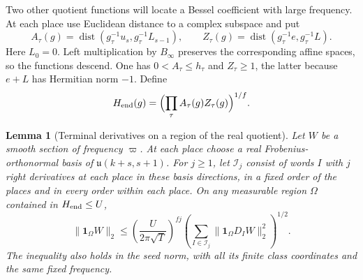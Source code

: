 \documentclass[a4paper,11pt]{article}
\newtheorem{lemma}[proposition]{Lemma}
\theoremstyle{definition}
\theoremstyle{remark}
\numberwithin{equation}{section}
\begin{document}
Two other quotient functions will locate a Bessel coefficient
with large frequency. At each place use Euclidean distance
to a complex subspace and put
\[
 A_\tau(g)=\operatorname{dist}(g_\tau^{-1}u_s,g_\tau^{-1}L_{s-1}),
 \qquad Z_\tau(g)=\operatorname{dist}(g_\tau^{-1}e,g_\tau^{-1}L).
\]
Here \(L_0=0\). Left multiplication by \(B_\infty\) preserves
the corresponding affine spaces, so the functions descend.
One has \(0<A_\tau\le h_\tau\) and \(Z_\tau\ge1\), the latter
because \(e+L\) has Hermitian norm \(-1\). Define
\[
        H_{\rm end}(g)=\Bigl(\prod_\tau A_\tau(g)Z_\tau(g)\Bigr)^{1/f}.
\]

\begin{lemma}[Terminal derivatives on a region of the real quotient]
\label{lem:terminal151}
Let \(W\) be a smooth section of frequency \(\varpi\).
At each place choose a real Frobenius-orthonormal basis of
\(\mathfrak u(k+s,s+1)\). For \(j\ge1\), let \(\mathcal I_j\)
consist of words \(I\) with \(j\) right derivatives at each
place in these basis directions, in a fixed order of the
places and in every order within each place. On any measurable
region \(\Omega\) contained in \(H_{\rm end}\le U\),
\begin{equation}
 \|\mathbf1_\Omega W\|_2
 \le \left(\frac{U}{2\pi\sqrt T}\right)^{fj}
           \left(\sum_{I\in\mathcal I_j}
                      \|\mathbf1_\Omega D_I W\|_2^2\right)^{1/2}.
     \label{eq:terminal151}
\end{equation}
The inequality also holds in the seed norm, with all its finite
class coordinates and the same fixed frequency.
\end{lemma}
\end{document}
